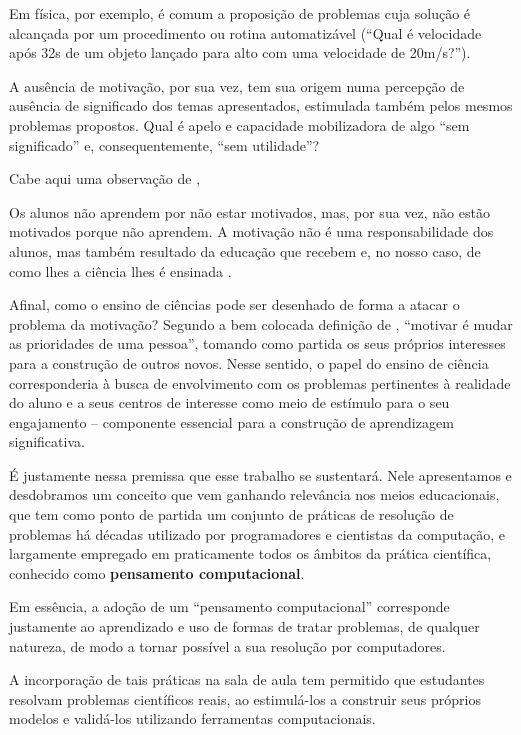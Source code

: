 Em física, por exemplo, é comum a proposição de problemas cuja solução é alcançada por um procedimento ou rotina automatizável (``Qual é velocidade após 32s de um objeto lançado para alto com uma velocidade de 20m/s?''). 

A ausência de motivação, por sua vez, tem sua origem numa percepção de ausência de significado dos temas apresentados, estimulada também pelos mesmos problemas propostos. Qual é apelo e capacidade mobilizadora de algo ``sem significado'' e, consequentemente, ``sem utilidade''? 

Cabe aqui uma observação de ,

\begin{citacao}
Os alunos não aprendem por não estar motivados, mas, por sua vez, não estão motivados porque não aprendem. A motivação não é uma responsabilidade dos alunos, mas também resultado da educação que recebem e, no nosso caso, de como lhes a ciência lhes é ensinada \cite{Pozo}.
\end{citacao}

Afinal, como o ensino de ciências pode ser desenhado de forma a atacar o problema da motivação? Segundo a bem colocada definição de , ``motivar é mudar as prioridades de uma pessoa'', tomando como partida os seus próprios interesses para a construção de outros novos. Nesse sentido, o papel do ensino de ciência corresponderia à busca de envolvimento com os problemas pertinentes à realidade do aluno e a seus centros de interesse como meio de estímulo para o seu engajamento -- componente essencial para a construção de aprendizagem significativa. 

É justamente nessa premissa que esse trabalho se sustentará. Nele apresentamos e desdobramos um conceito que vem ganhando relevância nos meios educacionais, que tem como ponto de partida um conjunto de práticas de resolução de problemas há décadas utilizado por programadores e cientistas da computação, e largamente empregado em praticamente todos os âmbitos da prática científica, conhecido como \textbf{pensamento computacional}.

Em essência, a adoção de um ``pensamento computacional'' corresponde justamente ao aprendizado e uso de formas de tratar problemas, de qualquer natureza, de modo a tornar possível a sua resolução por computadores. 

A incorporação de tais práticas na sala de aula tem permitido que estudantes resolvam problemas científicos reais, ao estimulá-los a construir seus próprios modelos e validá-los utilizando ferramentas computacionais.

